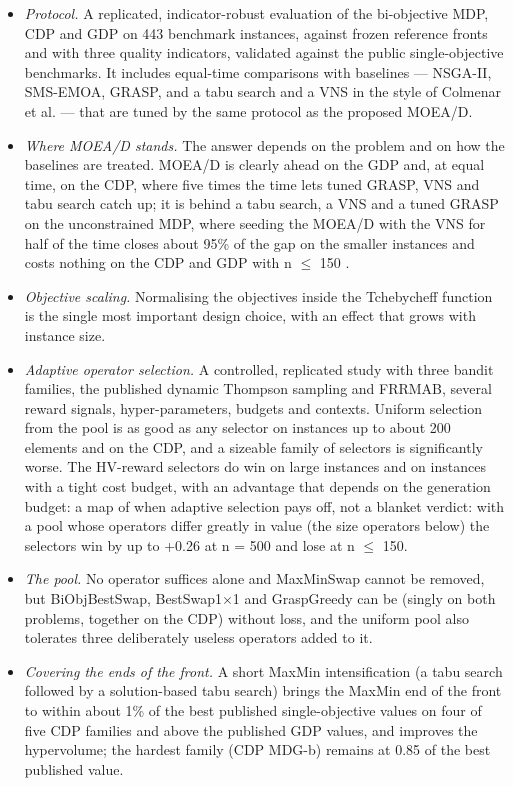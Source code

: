 \begin{itemize}
\item \emph{Protocol.} A replicated, indicator-robust evaluation of the bi-objective MDP, CDP and GDP on 443 benchmark instances, against frozen reference fronts and with three quality indicators, validated against the public single-objective benchmarks. It includes equal-time comparisons with baselines --- NSGA-II, SMS-EMOA, GRASP, and a tabu search and a VNS in the style of Colmenar et al. --- that are tuned by the same protocol as the proposed MOEA/D.
\item \emph{Where MOEA/D stands.} The answer depends on the problem and on how the baselines are treated. MOEA/D is clearly ahead on the GDP and, at equal time, on the CDP, where five times the time lets tuned GRASP, VNS and tabu search catch up; it is behind a tabu search, a VNS and a tuned GRASP on the unconstrained MDP, where seeding the MOEA/D with the VNS for half of the time closes about 95\% of the gap on the smaller instances and costs nothing on the CDP and GDP with n $\leq$ 150 .
\item \emph{Objective scaling.} Normalising the objectives inside the Tchebycheff function is the single most important design choice, with an effect that grows with instance size.
\item \emph{Adaptive operator selection.} A controlled, replicated study with three bandit families, the published dynamic Thompson sampling and FRRMAB, several reward signals, hyper-parameters, budgets and contexts. Uniform selection from the pool is as good as any selector on instances up to about 200 elements and on the CDP, and a sizeable family of selectors is significantly worse. The HV-reward selectors do win on large instances and on instances with a tight cost budget, with an advantage that depends on the generation budget: a map of when adaptive selection pays off, not a blanket verdict: with a pool whose operators differ greatly in value (the size operators below) the selectors win by up to +0.26 at n = 500 and lose at n $\leq$ 150.
\item \emph{The pool.} No operator suffices alone and MaxMinSwap cannot be removed, but BiObjBestSwap, BestSwap1$\times$1 and GraspGreedy can be (singly on both problems, together on the CDP) without loss, and the uniform pool also tolerates three deliberately useless operators added to it.
\item \emph{Covering the ends of the front.} A short MaxMin intensification (a tabu search followed by a solution-based tabu search) brings the MaxMin end of the front to within about 1\% of the best published single-objective values on four of five CDP families and above the published GDP values, and improves the hypervolume; the hardest family (CDP MDG-b) remains at 0.85 of the best published value.

\end{itemize}
